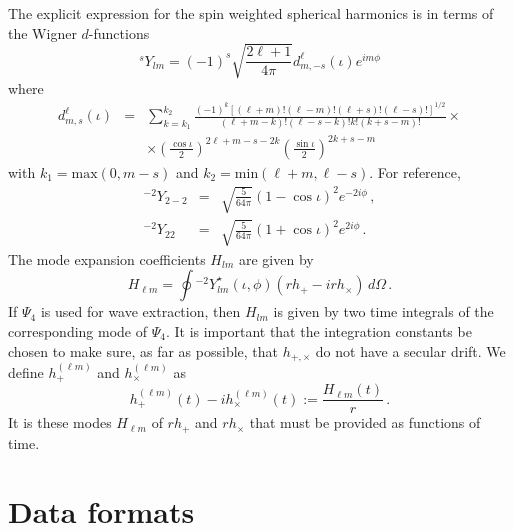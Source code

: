 \documentclass{article}
\numberwithin{equation}{section}
\newcommand{\Ys}{{{}^sY}}
\newcommand{\Ytwo}{{{}^{-2}Y}}
\begin{document}
The explicit expression for the spin weighted spherical harmonics is
in terms of the Wigner $d$-functions
\begin{equation}
  \label{eq:5}
   \Ys_{lm} = (-1)^s\sqrt{\frac{2\ell+1}{4\pi}} d^\ell_{m,-s}(\iota)e^{im\phi}
\end{equation}
where
\begin{eqnarray}
  \label{eq:6}
  d^\ell_{m,s}(\iota) &=& \sum_{k = k_1}^{k_2}
    \frac{(-1)^k[(\ell+m)!(\ell-m)!(\ell+s)!(\ell-s)!]^{1/2}}{(\ell +m
      -k)!(\ell-s-k)!k!(k+s-m)!} \times \\ 
    &&\times \left(\frac{\cos\iota}{2}\right)^{2\ell+m-s-2k}\left(\frac{\sin\iota}{2}\right)^{2k+s-m}  
\end{eqnarray}
with $k_1 = \textrm{max}(0, m-s)$ and $k_2=\textrm{min}(\ell+m,
\ell-s)$.  For reference,
\begin{eqnarray}
  \label{eq:7}
  \Ytwo_{2-2} &=& \sqrt{\frac{5}{64\pi}}(1-\cos\iota)^2e^{-2i\phi}\,, \\
  \Ytwo_{22} &=& \sqrt{\frac{5}{64\pi}}(1+\cos\iota)^2e^{2i\phi} \,.
\end{eqnarray}
The mode expansion coefficients $H_{lm}$ are given by
\begin{equation}
  \label{eq:10}
  H_{\ell m} = \oint \Ytwo_{lm}^\star(\iota,\phi)(rh_+-irh_\times )\,d\Omega\,.
\end{equation}
If $\Psi_4$ is used for wave extraction, then $H_{lm}$ is given by two
time integrals of the corresponding mode of $\Psi_4$.  It is important
that the integration constants be chosen to make sure, as far as
possible, that $h_{+,\times}$ do not have a secular drift. 
We define $h_+^{(\ell m)}$ and $h_\times^{(\ell m)}$ as
\begin{equation}
  \label{eq:11}
  h_+^{(\ell m)}(t) -ih_\times^{(\ell m)}(t) := \frac{H_{\ell m}(t)}{r}\,.  
\end{equation}
It is these modes $H_{\ell m}$ of $rh_+$ and $rh_\times$ that must be
provided as functions of time.  




\section{Data formats}
\label{sec:format}
\end{document}
